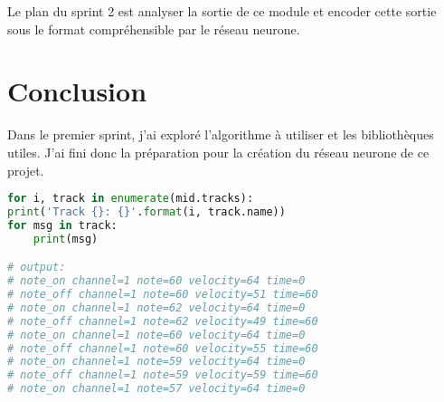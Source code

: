 \documentclass{article}
\begin{document}
\par Le plan du sprint 2 est analyser la sortie de ce module et encoder cette sortie sous le format compréhensible par le réseau neurone.

\section{Conclusion}

\par Dans le premier sprint, j'ai exploré l'algorithme à utiliser et les bibliothèques utiles. J'ai fini donc la préparation pour la création du réseau neurone de ce projet. 

\begin{minipage}[t]{\textwidth}
\begin{lstlisting}[language=Python, caption={Un exemple du programme qui permet de lire le fichier \texttt{midi}.}, label={prog}]
for i, track in enumerate(mid.tracks):
print('Track {}: {}'.format(i, track.name))
for msg in track:
    print(msg)

# output:
# note_on channel=1 note=60 velocity=64 time=0
# note_off channel=1 note=60 velocity=51 time=60
# note_on channel=1 note=62 velocity=64 time=0
# note_off channel=1 note=62 velocity=49 time=60
# note_on channel=1 note=60 velocity=64 time=0
# note_off channel=1 note=60 velocity=55 time=60
# note_on channel=1 note=59 velocity=64 time=0
# note_off channel=1 note=59 velocity=59 time=60
# note_on channel=1 note=57 velocity=64 time=0
\end{lstlisting}
\end{minipage}



\end{document}
